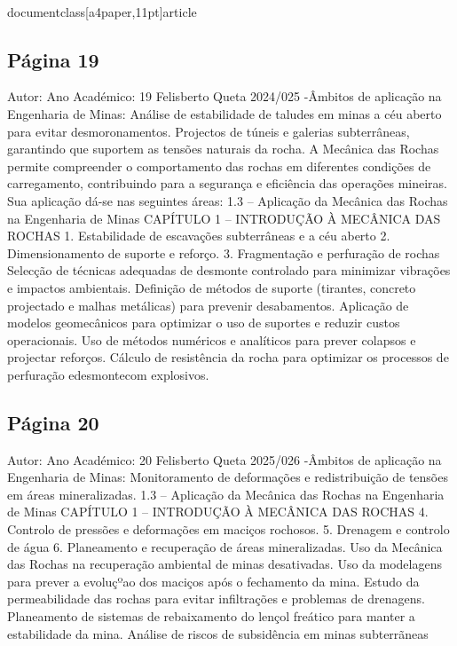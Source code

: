 \\documentclass[a4paper,11pt]{article}
\begin{document}
\subsection*{Página 19}
Autor:
Ano Académico:
19
Felisberto Queta
2024/025
-Âmbitos de aplicação na Engenharia de Minas:
Análise de estabilidade de taludes em minas a céu aberto para evitar
desmoronamentos.
Projectos de túneis e galerias subterrâneas, garantindo que suportem as 
tensões naturais da rocha.
A Mecânica das Rochas permite compreender o comportamento das rochas em diferentes condições de carregamento, 
contribuindo para a segurança e eficiência das operações mineiras. Sua aplicação dá-se nas seguintes áreas:
1.3 – Aplicação da Mecânica das Rochas na Engenharia de Minas
CAPÍTULO 1 – INTRODUÇÃO À MECÂNICA DAS ROCHAS
1. Estabilidade de escavações subterrâneas e 
a céu aberto
2. Dimensionamento de suporte e reforço.
3. Fragmentação e perfuração de rochas
Selecção de técnicas adequadas de desmonte controlado para minimizar 
vibrações e impactos ambientais.
Definição de métodos de suporte (tirantes, concreto projectado e malhas
metálicas) para prevenir desabamentos.
Aplicação de modelos geomecânicos para optimizar o uso de suportes e 
reduzir custos operacionais.
Uso de métodos numéricos e analíticos para prever colapsos e projectar
reforços.
Cálculo de resistência da rocha para optimizar os processos de 
perfuração edesmontecom explosivos.



\subsection*{Página 20}
Autor:
Ano Académico:
20
Felisberto Queta
2025/026
-Âmbitos de aplicação na Engenharia de Minas:
Monitoramento de deformações e redistribuição de tensões em áreas 
mineralizadas.
1.3 – Aplicação da Mecânica das Rochas na Engenharia de Minas
CAPÍTULO 1 – INTRODUÇÃO À MECÂNICA DAS ROCHAS
4. Controlo de pressões e deformações em 
maciços rochosos.
5. Drenagem e controlo de água
6. Planeamento e recuperação de áreas 
mineralizadas.
Uso da Mecânica das Rochas na recuperação ambiental de minas 
desativadas.
Uso da modelagens para prever a evoluçºao dos maciços após o 
fechamento da mina.
Estudo
da
permeabilidade
das
rochas
para
evitar
infiltrações
e
problemas de drenagens.
Planeamento de sistemas de rebaixamento do lençol freático para 
manter a estabilidade da mina.
Análise de riscos de subsidência em minas subterrãneas
\end{document}

